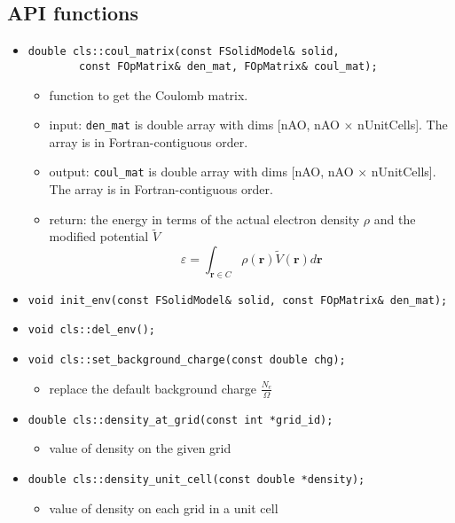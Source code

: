 \documentclass{article}
\begin{document}
\subsection{API functions}
\begin{itemize}
\item
\begin{verbatim}
double cls::coul_matrix(const FSolidModel& solid,
        const FOpMatrix& den_mat, FOpMatrix& coul_mat);
\end{verbatim}
\begin{itemize}
  \item function to get the Coulomb matrix.
  \item input: \verb$den_mat$ is double array with dims [nAO, nAO $\times$
    nUnitCells].  The array is in Fortran-contiguous order.
  \item output: \verb$coul_mat$ is double array with dims [nAO, nAO $\times$
    nUnitCells].  The array is in Fortran-contiguous order.
  \item return: the energy in terms of the actual electron density $\rho$ and
    the modified potential $\tilde{V}$
    \begin{equation}
      \varepsilon = \int_{\mathbf{r}\in C} \rho(\mathbf{r})\tilde{V}(\mathbf{r}) d\mathbf{r}
      \label{}
    \end{equation}
\end{itemize}

\item \verb$void init_env(const FSolidModel& solid, const FOpMatrix& den_mat);$
\item \verb$void cls::del_env();$
\item \verb$void cls::set_background_charge(const double chg);$
\begin{itemize}
  \item replace the default background charge $\frac{N_{e}}{\Omega}$
\end{itemize}

\item \verb$double cls::density_at_grid(const int *grid_id);$
\begin{itemize}
  \item value of density on the given grid
\end{itemize}

\item \verb$double cls::density_unit_cell(const double *density);$
\begin{itemize}
  \item value of density on each grid in a unit cell
\end{itemize}


\end{itemize}
\end{document}
